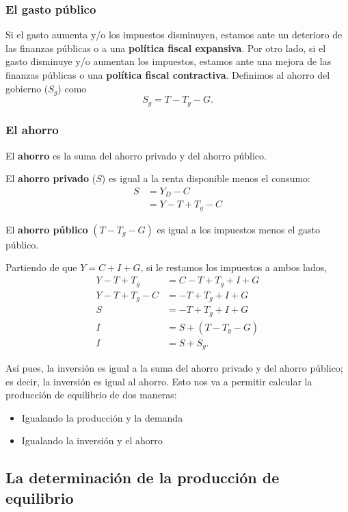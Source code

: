 \documentclass[10pt, landscape]{article}
\begin{document}
\begin{multicols*}{3}
\subsubsection{El gasto público}
Si el gasto aumenta y/o los impuestos disminuyen, estamos ante un deterioro de las finanzas públicas o a una \textbf{política fiscal expansiva}. Por otro lado, si el gasto disminuye y/o aumentan los impuestos, estamos ante una mejora de las finanzas públicas o una \textbf{política fiscal contractiva}. Definimos al ahorro del gobierno ($S_g$) como 
\[ S_g = T - T_g - G. \]

\subsubsection{El ahorro}
El \textbf{ahorro} es la suma del ahorro privado y del ahorro público.

El \textbf{ahorro privado} ($S$) es igual a la renta disponible menos el consumo:
\begin{align*}
    S &= Y_D - C \\
      &= Y - T + T_g - C
\end{align*}

El \textbf{ahorro público} $(T-T_g-G)$ es igual a los impuestos menos el gasto público.

Partiendo de que $Y=C+I+G$, si le restamos los impuestos a ambos lados,
\begin{align*}
    Y-T+T_g &= C-T + T_g + I + G \\
    Y-T+T_g - C &= -T + T_g + I + G \\
    S &= -T + T_g + I + G \\
    I &= S + (T-T_g - G) \\
    I &= S + S_g.
\end{align*}

Así pues, la inversión es igual a la suma del ahorro privado y del ahorro público; es decir, la inversión es igual al ahorro. Esto nos va a permitir calcular la producción de equilibrio de dos maneras:
\begin{itemize}
    \item Igualando la producción y la demanda
    \item Igualando la inversión y el ahorro
\end{itemize}

\subsection{La determinación de la producción de equilibrio}


\end{multicols*}
\end{document}
